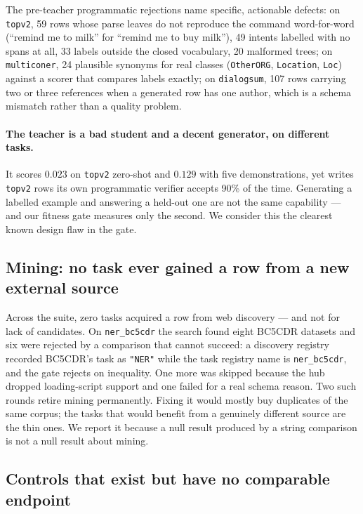 \documentclass[sigconf,10pt]{acmart}
\newcommand{\tsk}[1]{\texttt{#1}}
\begin{document}
The pre-teacher programmatic rejections name specific, actionable defects: on \tsk{topv2},
59 rows whose parse leaves do not reproduce the command word-for-word
(``remind me to milk'' for ``remind me to buy milk''), 49 intents labelled with no spans at
all, 33 labels outside the closed vocabulary, 20 malformed trees; on \tsk{multiconer}, 24
plausible synonyms for real classes (\texttt{OtherORG}, \texttt{Location}, \texttt{Loc})
against a scorer that compares labels exactly; on \tsk{dialogsum}, 107 rows carrying two or
three references when a generated row has one author, which is a schema mismatch rather than
a quality problem.

\paragraph{The teacher is a bad student and a decent generator, on different tasks.}
It scores $0.023$ on \tsk{topv2} zero-shot and $0.129$ with five demonstrations, yet writes
\tsk{topv2} rows its own programmatic verifier accepts 90\% of the time. Generating a labelled
example and answering a held-out one are not the same capability --- and our fitness gate
measures only the second. We consider this the clearest known design flaw in the gate.

\subsection{Mining: no task ever gained a row from a new external source}

Across the suite, zero tasks acquired a row from web discovery --- and not for lack of
candidates. On \tsk{ner\_bc5cdr} the search found eight BC5CDR datasets and six were rejected
by a comparison that cannot succeed: a discovery registry recorded BC5CDR's task as
\texttt{"NER"} while the task registry name is \tsk{ner\_bc5cdr}, and the gate rejects on
inequality. One more was skipped because the hub dropped loading-script support and one failed
for a real schema reason. Two such rounds retire mining permanently. Fixing it would mostly
buy duplicates of the same corpus; the tasks that would benefit from a genuinely different
source are the thin ones. We report it because a null result produced by a string comparison
is not a null result about mining.

\subsection{Controls that exist but have no comparable endpoint}
\end{document}
